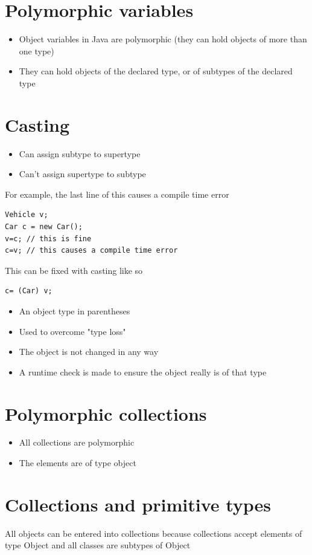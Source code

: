 \documentclass{article}[18pt]
\begin{document}
\section{Polymorphic variables}
\begin{itemize}
	\item Object variables in Java are polymorphic (they can hold objects of more than one type)
	\item They can hold objects of the declared type, or of subtypes of the declared type
\end{itemize}
\section{Casting}
\begin{itemize}
	\item Can assign subtype to supertype
	\item Can't assign supertype to subtype
\end{itemize}
For example, the last line of this causes a compile time error
\begin{verbatim}
Vehicle v;
Car c = new Car();
v=c; // this is fine
c=v; // this causes a compile time error
\end{verbatim}
This can be fixed with casting like so
\begin{verbatim}
c= (Car) v;
\end{verbatim}
\begin{itemize}
	\item An object type in parentheses
	\item Used to overcome "type loss"
	\item The object is not changed in any way
	\item A runtime check is made to ensure the object really is of that type
\end{itemize}
\section{Polymorphic collections}
\begin{itemize}
	\item All collections are polymorphic
	\item The elements are of type object
\end{itemize}
\section{Collections and primitive types}
All objects can be entered into collections because collections accept elements of type Object and all classes are subtypes of Object
\end{document}
